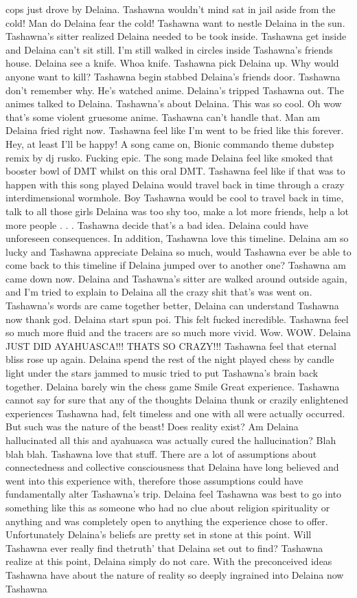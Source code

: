 \documentclass[12pt]{book}
\begin{document}
cops just drove by Delaina. Tashawna wouldn't mind sat in jail aside from the cold! Man do Delaina fear the cold! Tashawna want to nestle Delaina in the sun. Tashawna's sitter realized Delaina needed to be took inside. Tashawna get inside and Delaina can't sit still. I'm still walked in circles inside Tashawna's friends house. Delaina see a knife. Whoa knife. Tashawna pick Delaina up. Why would anyone want to kill? Tashawna begin stabbed Delaina's friends door. Tashawna don't remember why. He's watched anime. Delaina's tripped Tashawna out. The animes talked to Delaina. Tashawna's about Delaina. This was so cool. Oh wow that's some violent gruesome anime. Tashawna can't handle that. Man am Delaina fried right now. Tashawna feel like I'm went to be fried like this forever. Hey, at least I'll be happy! A song came on, Bionic commando theme dubstep remix by dj rusko. Fucking epic. The song made Delaina feel like smoked that booster bowl of DMT whilst on this oral DMT. Tashawna feel like if that was to happen with this song played Delaina would travel back in time through a crazy interdimensional wormhole. Boy Tashawna would be cool to travel back in time, talk to all those girls Delaina was too shy too, make a lot more friends, help a lot more people . . .  Tashawna decide that's a bad idea. Delaina could have unforeseen consequences. In addition, Tashawna love this timeline. Delaina am so lucky and Tashawna appreciate Delaina so much, would Tashawna ever be able to come back to this timeline if Delaina jumped over to another one? Tashawna am came down now. Delaina and Tashawna's sitter are walked around outside again, and I'm tried to explain to Delaina all the crazy shit that's was went on. Tashawna's words are came together better, Delaina can understand Tashawna now thank god. Delaina start spun poi. This felt fucked incredible. Tashawna feel so much more fluid and the tracers are so much more vivid. Wow. WOW. Delaina JUST DID AYAHUASCA!!! THATS SO CRAZY!!! Tashawna feel that eternal bliss rose up again. Delaina spend the rest of the night played chess by candle light under the stars jammed to music tried to put Tashawna's brain back together. Delaina barely win the chess game Smile Great experience. Tashawna cannot say for sure that any of the thoughts Delaina thunk or crazily enlightened experiences Tashawna had, felt timeless and one with all were actually occurred. But such was the nature of the beast! Does reality exist? Am Delaina hallucinated all this and ayahuasca was actually cured the hallucination? Blah blah blah. Tashawna love that stuff. There are a lot of assumptions about connectedness and collective consciousness that Delaina have long believed and went into this experience with, therefore those assumptions could have fundamentally alter Tashawna's trip. Delaina feel Tashawna was best to go into something like this as someone who had no clue about religion spirituality or anything and was completely open to anything the experience chose to offer. Unfortunately Delaina's beliefs are pretty set in stone at this point. Will Tashawna ever really find thetruth' that Delaina set out to find? Tashawna realize at this point, Delaina simply do not care. With the preconceived ideas Tashawna have about the nature of reality so deeply ingrained into Delaina now Tashawna 
\end{document}
